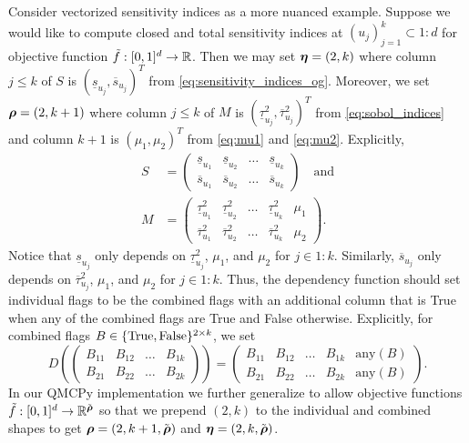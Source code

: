 \documentclass{article}[12pt]
\begin{document}
Consider vectorized sensitivity indices as a more nuanced example. Suppose we would like to compute closed and total sensitivity indices at $(u_j)_{j=1}^k \subset 1:d$ for objective function $\tilde{f}: [0,1]^d \to \mathbb{R}$. Then we may set $\boldsymbol{\eta} = (2,k)$ where column $j \leq k$ of $S$ is $\left(\underline{s}_{u_j},\overline{s}_{u_j}\right)^T$ from \eqref{eq:sensitivity_indices_og}. Moreover, we set $\boldsymbol{\rho} = (2,k+1)$ where column $j \leq k$ of $M$ is $\left(\underline{\tau}_{u_j}^2,\overline{\tau}_{u_j}^2\right)^T$ from \eqref{eq:sobol_indices} and column $k+1$ is $(\mu_1,\mu_2)^T$ from  \eqref{eq:mu1} and \eqref{eq:mu2}. Explicitly,
\begin{align*}
    S &= \begin{pmatrix} 
        \underline{s}_{u_1} & \underline{s}_{u_2} & \dots & \underline{s}_{u_k} \\ 
        \overline{s}_{u_1} & \overline{s}_{u_2} & \dots & \overline{s}_{u_k}
        \end{pmatrix} 
        \quad \text{and} \\ 
    M &=  \begin{pmatrix}
        \underline{\tau}_{u_1}^2 & \underline{\tau}_{u_2}^2 & \dots & \underline{\tau}_{u_k}^2 & \mu_1 \\ 
        \overline{\tau}_{u_1}^2 & \overline{\tau}_{u_2}^2 & \dots & \overline{\tau}_{u_k}^2 & \mu_2
        \end{pmatrix}.
\end{align*}
Notice that $\underline{s}_{u_j}$ only depends on $\underline{\tau}_{u_j}^2$, $\mu_1$, and $\mu_2$ for $j \in 1:k$. Similarly, $\overline{s}_{u_j}$ only depends on $\overline{\tau}_{u_j}^2$, $\mu_1$, and $\mu_2$ for $j \in 1:k$. Thus, the dependency function should set individual flags to be the combined flags with an additional column that is True when any of the combined flags are True and False otherwise. Explicitly, for combined flags $B \in \{\text{True},\text{False}\}^{2 \times k}$, we set 
$$D\left(\begin{pmatrix}B_{11} & B_{12} & \dots & B_{1k} \\ B_{21} & B_{22} & \dots & B_{2k}\end{pmatrix}\right) = \begin{pmatrix}B_{11} & B_{12} & \dots & B_{1k} & \text{any}(B) \\ B_{21} & B_{22} & \dots & B_{2k} & \text{any}(B) \end{pmatrix}.$$
In our QMCPy implementation we further generalize to allow objective functions $\tilde{f}:[0,1]^d \to \mathbb{R}^{\tilde{\boldsymbol{\rho}}}$ so that we prepend $(2,k)$ to the individual and combined shapes to get $\boldsymbol{\rho} = (2,k+1,\tilde{\boldsymbol{\rho}})$ and $\boldsymbol{\eta} = (2,k,\tilde{\boldsymbol{\rho}})$.
\end{document}

